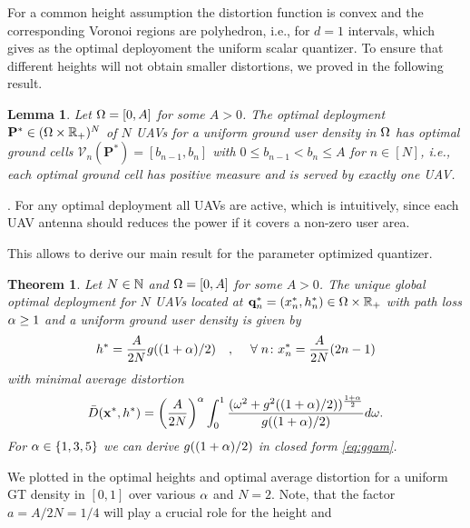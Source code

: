 \documentclass[smallabstract,smallcaptions]{dccpaper}
\newtheorem{lemma}{Lemma}
\newtheorem{theorem}{Theorem}
\newenvironment{remark}{\par\vspace{1.5ex}\noindent{\em Remark\/}.}{\par\vspace{1.5ex}}
\renewcommand{\vQ}{\mathbf P}
\newcommand{\Vor}{\ensuremath{\mathcal{V}}}         %
\newcommand{\Dis}{\ensuremath{D}}                    %
\newcommand{\AvDis}{\ensuremath{\bar{\Dis}}}         %
\newcommand{\philippstart}{\color{black}}
\begin{document}
\newcommand{\pGlob}{\ensuremath{x^{*}}}
\newcommand{\hGlob}{\ensuremath{h^{*}}}
\newcommand{\qGlob}{\ensuremath{{\mathbf q}^{*}}}
\newcommand{\qLoc}{\ensuremath{{\mathbf q}^{*}}}
%
%
\philippstart
%
%
\color{black}

For a common height assumption the distortion function is convex and the corresponding Voronoi regions are polyhedron,
i.e., for $d=1$ intervals, which gives as the optimal deployoment the uniform scalar quantizer. To ensure that different
heights will not obtain smaller distortions, we proved in \cite{GWJ18a} the following result. 
%
\philippstart
%
\begin{lemma}\label{lemma:allActive}
  Let $\Omega=[0,A]$ for some $A>0$. The optimal deployment $\vQ^*\in(\Ome\times\R_+)^N$ of $N$ UAVs for a uniform ground
  user density in $\Omega$ has optimal ground cells $\Vor_n(\vQ^*)=[b_{n-1},b_n]$ with $0\leq b_{n-1}<b_n\leq A$ for
  $n\in[N]$, i.e., each optimal ground cell has positive measure and is served by exactly one UAV. 
\end{lemma}
%
\begin{remark}
  For any optimal deployment all UAVs are active, which is intuitively, since each UAV
  antenna should reduces the power if it covers a non-zero user area.
\end{remark}
%
This allows to derive our main result for the parameter optimized quantizer.
%
\begin{theorem}\label{thm:commonheight}
  Let $N\in{\ensuremath{\mathbb N}}$ and $\Omega=[0,A]$ for some $A> 0$. The \emph{unique global optimal deployment} for $N$ UAVs located  at
  $\qLoc_n=(x_n^{*},h_n^{*})\in \Ome\times \R_+$ with path loss $\alpha\geq 1$ and a uniform ground user density is given
  by   
   \begin{align}
     h^*= \frac{A}{2N} g((1+\alp)/2)\quad,\quad\forall n \colon \pGlob_n= \frac{A}{2N} (2n-1)\label{eq:optimaldeploy} 
  \end{align}
  with minimal average distortion
  \begin{align}
    \AvDis(\vx^*,h^*)=\left(\frac{A}{2N}\right)^{\alp}  \int_0^1
    \frac{(\ome^2+g^2( (1+\alp)/2))^{\frac{1+\alp}{2}}}{g( (1+\alp)/2)}
    d\ome\label{eq:optimumavpow}.
  \end{align}
  For $\alpha\in\{1,3,5\}$ we can derive $g((1+\alpha)/2)$ in closed form  \eqref{eq:ggam}.
\end{theorem}
We plotted in  the optimal heights and optimal average distortion for a uniform GT density in
$[0,1]$ over various $\alpha$ and $N=2$. Note, that the factor $a=A/2N=1/4$ will play a crucial role for the height and
\end{document}
